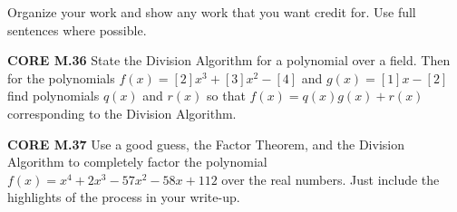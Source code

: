 \documentclass[addpoints]{exam}
\begin{document}
Organize your work and show any work that you want credit for. Use full sentences where possible.

\begin{questions}

\question \textbf{CORE M.36}
State the Division Algorithm for a polynomial over a field. Then for the polynomials $f(x)=[2]x^3+[3]x^2-[4]$ and $g(x)=[1]x-[2]$ find polynomials $q(x)$ and $r(x)$ so that $f(x)=q(x)g(x)+r(x)$ corresponding to the Division Algorithm.


\question \textbf{CORE M.37}
Use a good guess, the Factor Theorem, and the Division Algorithm to completely factor the polynomial $f(x)=x^4+2x^3-57x^2-58x+112$ over the real numbers. Just include the highlights of the process in your write-up.


\end{questions}
\end{document}
